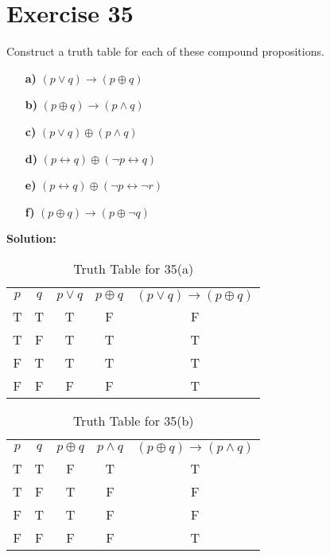 \documentclass{Axon}
\begin{document}
\section*{Exercise 35}
Construct a truth table for each of these compound propositions.
\begin{enumerate}
    \item[\textbf{a)}] \((p \lor q) \to (p \oplus q)\)
    \item[\textbf{b)}] \((p \oplus q) \to (p \land q)\)
    \item[\textbf{c)}] \((p \lor q) \oplus (p \land q)\)
    \item[\textbf{d)}] \((p \leftrightarrow q) \oplus (\lnot p \leftrightarrow q)\)
    \item[\textbf{e)}] \((p \leftrightarrow q) \oplus (\lnot p \leftrightarrow \lnot r)\)
    \item[\textbf{f)}] \((p \oplus q) \to (p \oplus \lnot q)\)
\end{enumerate}

\noindent
\textbf{Solution:}
\begin{table}[ht]
    \centering
    \begin{tabular}{c|c|c|c|c}
        \(p\) & \(q\) & \(p \lor q\) & \(p \oplus q\) & \((p \lor q) \to (p \oplus q)\) \\
        T     & T     & T            & F              & F                               \\
        T     & F     & T            & T              & T                               \\
        F     & T     & T            & T              & T                               \\
        F     & F     & F            & F              & T
    \end{tabular}
    \caption{Truth Table for 35(a)}
\end{table}

\begin{table}[ht]
    \centering
    \begin{tabular}{c|c|c|c|c}
        \(p\) & \(q\) & \(p \oplus q\) & \(p \land q\) & \((p \oplus q) \to (p \land q)\) \\
        T     & T     & F              & T             & T                                \\
        T     & F     & T              & F             & F                                \\
        F     & T     & T              & F             & F                                \\
        F     & F     & F              & F             & T
    \end{tabular}
    \caption{Truth Table for 35(b)}
\end{table}
\end{document}

